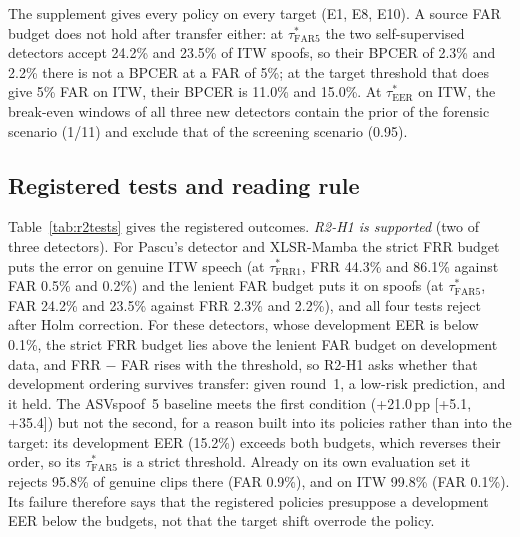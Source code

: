 \documentclass[review,authoryear]{elsarticle}
\newcommand{\todo}[1]{\textcolor{red}{[#1]}}
\newcommand{\gentab}[1]{\IfFileExists{gen/#1.tex}{}{\todo{generated table \detokenize{#1} pending}}}
\newcommand{\tauE}{\tau^{*}_{\mathrm{EER}}}
\newcommand{\tauF}[1]{\tau^{*}_{\mathrm{FRR}#1}}
\newcommand{\tauA}[1]{\tau^{*}_{\mathrm{FAR}#1}}
\begin{document}
The supplement gives every policy on every target (E1, E8, E10). A source FAR budget does not hold after transfer
either: at \(\tauA{5}\) the two self-supervised detectors accept 24.2\% and 23.5\% of ITW spoofs, so their BPCER of
2.3\% and 2.2\% there is not a BPCER at a FAR of 5\%; at the target threshold that does give 5\% FAR on ITW,
their BPCER is 11.0\% and 15.0\%. At \(\tauE\) on ITW, the break-even windows of all three new detectors contain the
prior of the forensic scenario (1/11) and exclude that of the screening scenario (0.95).

\subsection{Registered tests and reading rule}
\label{sec:r2tests}
Table~\ref{tab:r2tests} gives the registered outcomes. \emph{R2-H1 is supported} (two of three detectors). For Pascu's
detector and XLSR-Mamba the strict FRR budget puts the error on genuine ITW speech (at \(\tauF{1}\), FRR 44.3\% and
86.1\% against FAR 0.5\% and 0.2\%) and the lenient FAR budget puts it on spoofs (at \(\tauA{5}\), FAR 24.2\% and 23.5\%
against FRR 2.3\% and 2.2\%), and all four tests reject after Holm correction. For these detectors, whose development
EER is below 0.1\%, the strict FRR budget lies above the lenient FAR budget on development data, and FRR \(-\) FAR rises
with the threshold, so R2-H1 asks whether that development ordering survives transfer: given round~1, a low-risk
prediction, and it held. The ASVspoof~5 baseline meets the first condition (+21.0\,pp [+5.1, +35.4]) but not the
second, for a reason built into its policies rather than into the target: its development EER (15.2\%) exceeds both
budgets, which reverses their order, so its \(\tauA{5}\) is a strict threshold. Already on its own evaluation set it
rejects 95.8\% of genuine clips there (FAR 0.9\%), and on ITW 99.8\% (FAR 0.1\%). Its failure therefore says that the
registered policies presuppose a development EER below the budgets, not that the target shift overrode the policy.

\begin{table}[!t]
\caption{Round-2 registered outcomes (speaker-cluster bootstrap, \(B=10{,}000\); exact permutation tests for R2-H3).
R2-H1: FRR\(-\)FAR at \(\tauF{1}\) / FAR\(-\)FRR at \(\tauA{5}\) on ITW (pp). R2-H2: LA19-eval TTG at \(\tauE\) per seed
(pp). R2-H3: trimmed minus untrimmed run means (pp; manipulation check, then the two tests of the family). R2-H4: models
meeting the rule per condition. \(^\ast\): rejected after Holm correction (R2-H1: both of the detector's tests
rejected). The reading rule is descriptive.}
\label{tab:r2tests}
\centering
\footnotesize
\setlength{\tabcolsep}{4pt}
\gentab{r2_tests}
\end{table}
\end{document}
